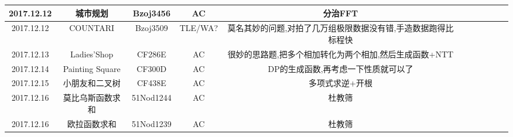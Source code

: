 \documentclass[landscape]{article}
\begin{document}
\begin{longtable}{ccccccccccc}
  \hline
  2017.12.12 & 城市规划 & Bzoj3456 & AC & 分治FFT\\
  \hline
  2017.12.12 & COUNTARI & Bzoj3509 & TLE/WA? & 莫名其妙的问题,对拍了几万组极限数据没有错,手造数据跑得比标程快\\
  \hline
  2017.12.13 & Ladies'Shop & CF286E & AC & 很妙的思路题,把多个相加转化为两个相加,然后生成函数+NTT\\
  \hline
  2017.12.14 & Painting Square & CF300D & AC & DP的生成函数,再考虑一下性质就可以了\\
  \hline
  2017.12.15 & 小朋友和二叉树 & CF438E & AC & 多项式求逆+开根\\
  \hline
  2017.12.16 & 莫比乌斯函数求和 & 51Nod1244 & AC & 杜教筛\\
  \hline
  2017.12.16 & 欧拉函数求和 & 51Nod1239 & AC & 杜教筛\\
  \hline

\end{longtable}
\end{document}
